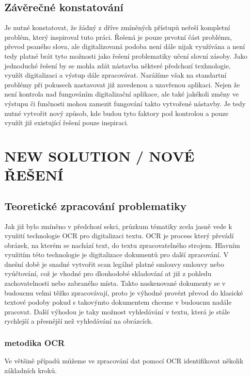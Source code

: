 \documentclass[journal]{IEEEtran}
\begin{document}
\subsection{Závěrečné konstatování}
Je nutné konstatovat, že žádný z dříve zmíněných přístupů neřeší  kompletní problém, který inspiroval tuto práci. Řešená je pouze  prvotní část problému, převod psaného slova, ale digitalizovaná podoba není dále nijak využívána a není tedy platné brát tyto možnosti jako řešení problematiky učení slovní zásoby.
Jako jednoduché řešení by se mohla zdát nástavba některé předchozí texhnologie, využít digitalizaci a výstup dále zpracovávat. Narážíme však na standartní problémy při pokusech nastavovat již zavedenou a uzavřenou aplikaci. Nejen že není  kontrola nad fungováním digitalizační aplikace, ale také jakékoli změny ve výstupu či funčnosti mohou zamezit fungování takto vytvořené nástavby.
Je tedy nutné vytvořit nový způsob, kde budou tyto faktory pod kontrolou a pouze využít již existující řešení pouze inspiraci.

\section{NEW SOLUTION / NOVÉ ŘEŠENÍ}

\subsection{Teoretické zpracování problematiky}
Jak již bylo zmíněno v předchozí sekci, průzkum tématiky zcela jasně vede k využití technologie \ac{OCR} pro digitalizaci textu.
\ac{OCR} je process který převádí obrázek, na kterém se nachází text, do textu zpracovatelného strojem.
Hlavním využitím této technologie je digitalizace dokumentů pro další zpracování. V dnešní době je snadné vytvořit scan legálně platné smlouvy smlouvy nebo vyúčtování, což je vhodné pro dlouhodobé skladování at již z pohledu zachovatelnosti nebo zabraného místa.
Takto naskenované dokumenty se v budoucnu velmi těžko zpracovávají, proto je výhodné provézt převod do klasické textové podoby pokud s takovýmto dokumentem chceme v budoucnu nadále pracovat. Další výhodou je taky možnost vyhledávání v textu, která je stále rychlejší a přesnější než vyhledávání na obrázcích.\cite{amazon_ocr}

\subsubsection{metodika OCR}
Ve většině případů můžeme ve zpracování dat pomocí \ac{OCR} identifikovat několik základních kroků.\cite{amazon_ocr}
\end{document}
